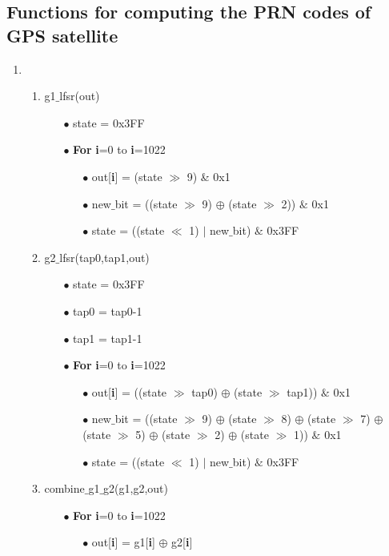 \documentclass[journal,10pt,onecolumn]{article}
\begin{document}
\subsection{Functions for computing the PRN codes of GPS satellite}
\begin{enumerate}
    \item 
    \begin{enumerate}
    \item g1$\_$lfsr(out)
    \begin{enumerate}
    \item[$\bullet$] state = 0x3FF
    \item[$\bullet$] \textbf{For} \textbf{i}=0 to \textbf{i}=1022
        \begin{enumerate}
            \item[$\bullet$] out[\textbf{i}] = (state $\gg$ 9) \& 0x1 
            \item[$\bullet$] new$\_$bit = ((state $\gg$ 9) $\oplus$ (state $\gg$ 2)) $\&$ 0x1
            \item[$\bullet$] state = ((state $\ll$ 1) $\vert$  new$\_$bit) $\&$ 0x3FF
        \end{enumerate}
    \end{enumerate}
    \item g2$\_$lfsr(tap0,tap1,out)
    \begin{enumerate}
        \item[$\bullet$] state = 0x3FF
        \item[$\bullet$] tap0 = tap0-1
        \item[$\bullet$] tap1 = tap1-1 
        \item[$\bullet$] \textbf{For} \textbf{i}=0 to \textbf{i}=1022
        \begin{enumerate}
            \item[$\bullet$] out[\textbf{i}] = ((state $\gg$ tap0) $\oplus$ (state $\gg$ tap1)) $\&$ 0x1
            \item[$\bullet$] new$\_$bit =  ((state $\gg$ 9) $\oplus$ (state $\gg$ 8) $\oplus$
            (state $\gg$ 7) $\oplus$ (state $\gg$ 5) $\oplus$
            (state $\gg$ 2) $\oplus$ (state $\gg$ 1)) $\&$ 0x1
            \item[$\bullet$] state = ((state $\ll$ 1) $\vert$ new$\_$bit) $\&$ 0x3FF
        \end{enumerate}
    \end{enumerate}

    \item combine$\_$g1$\_$g2(g1,g2,out)
    \begin{enumerate}
        \item[$\bullet$] \textbf{For} \textbf{i}=0 to \textbf{i}=1022
        \begin{enumerate}
            \item[$\bullet$] out[\textbf{i}] = g1[\textbf{i}] $\oplus$ g2[\textbf{i}]
        \end{enumerate}
    \end{enumerate}
\end{enumerate}
\end{enumerate}
\end{document}

